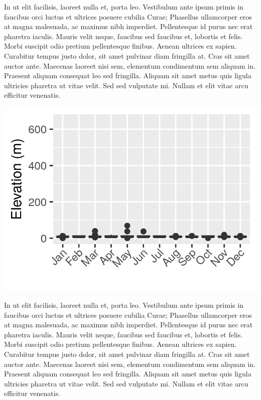\documentclass[12pt,openany,oneside]{book}
\theoremstyle{definition}
\theoremstyle{definition}
\theoremstyle{definition}
\theoremstyle{remark}
\begin{document}
In ut elit facilisis, laoreet nulla et, porta leo. Vestibulum ante ipsum
primis in faucibus orci luctus et ultrices posuere cubilia Curae;
Phasellus ullamcorper eros at magna malesuada, ac maximus nibh
imperdiet. Pellentesque id purus nec erat pharetra iaculis. Mauris velit
neque, faucibus sed faucibus et, lobortis et felis. Morbi suscipit odio
pretium pellentesque finibus. Aenean ultrices ex sapien. Curabitur
tempus justo dolor, sit amet pulvinar diam fringilla at. Cras sit amet
auctor ante. Maecenas laoreet nisi sem, elementum condimentum sem
aliquam in. Praesent aliquam consequat leo sed fringilla. Aliquam sit
amet metus quis ligula ultricies pharetra ut vitae velit. Sed sed
vulputate mi. Nullam et elit vitae arcu efficitur venenatis.

\includegraphics{assets/graphs/Dendrocygna-arcuata.png}

In ut elit facilisis, laoreet nulla et, porta leo. Vestibulum ante ipsum
primis in faucibus orci luctus et ultrices posuere cubilia Curae;
Phasellus ullamcorper eros at magna malesuada, ac maximus nibh
imperdiet. Pellentesque id purus nec erat pharetra iaculis. Mauris velit
neque, faucibus sed faucibus et, lobortis et felis. Morbi suscipit odio
pretium pellentesque finibus. Aenean ultrices ex sapien. Curabitur
tempus justo dolor, sit amet pulvinar diam fringilla at. Cras sit amet
auctor ante. Maecenas laoreet nisi sem, elementum condimentum sem
aliquam in. Praesent aliquam consequat leo sed fringilla. Aliquam sit
amet metus quis ligula ultricies pharetra ut vitae velit. Sed sed
vulputate mi. Nullam et elit vitae arcu efficitur venenatis.

\clearpage
\end{document}
